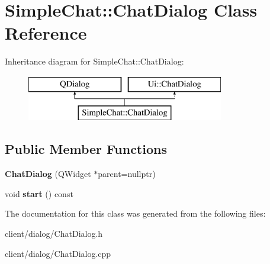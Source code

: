 \hypertarget{classSimpleChat_1_1ChatDialog}{\section{Simple\-Chat\-:\-:Chat\-Dialog Class Reference}
\label{classSimpleChat_1_1ChatDialog}
}
Inheritance diagram for Simple\-Chat\-:\-:Chat\-Dialog\-:\begin{figure}[H]
\begin{center}
\leavevmode
\includegraphics[height=2.000000cm]{classSimpleChat_1_1ChatDialog}
\end{center}
\end{figure}
\subsection*{Public Member Functions}
\begin{DoxyCompactItemize}
\item 
\hypertarget{classSimpleChat_1_1ChatDialog_a969efa56c5067874f46dca3d3eb0b84b}{{\bfseries Chat\-Dialog} (Q\-Widget $\ast$parent=nullptr)}\label{classSimpleChat_1_1ChatDialog_a969efa56c5067874f46dca3d3eb0b84b}

\item 
\hypertarget{classSimpleChat_1_1ChatDialog_ab20dcf9fbbbbfaa6f96adf505d3aaf7c}{void {\bfseries start} () const }\label{classSimpleChat_1_1ChatDialog_ab20dcf9fbbbbfaa6f96adf505d3aaf7c}

\end{DoxyCompactItemize}


The documentation for this class was generated from the following files\-:\begin{DoxyCompactItemize}
\item 
client/dialog/Chat\-Dialog.\-h\item 
client/dialog/Chat\-Dialog.\-cpp\end{DoxyCompactItemize}
